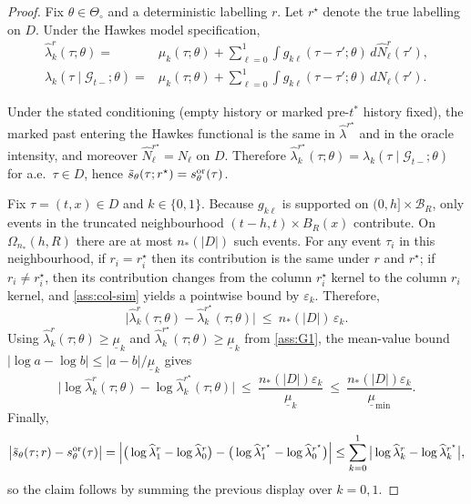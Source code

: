 \documentclass{statsoc}
\newcommand{\1}{\mathbbm{1}}
\begin{document}
\begin{proof}
Fix $\theta\in\Theta_\circ$ and a deterministic labelling $r$.
Let $r^\star$ denote the true labelling on $D$.
Under the Hawkes model specification,
\begin{align*}
\widehat\lambda_k^r(\tau;\theta)
=&
\mu_k(\tau;\theta)+\sum_{\ell=0}^1\int g_{k\ell}(\tau-\tau';\theta)\,d\widehat N_\ell^r(\tau'),\\
\lambda_k(\tau\mid\mathcal G_{t-};\theta)
=&
\mu_k(\tau;\theta)+\sum_{\ell=0}^1\int g_{k\ell}(\tau-\tau';\theta)\,d N_\ell(\tau').
\end{align*}

Under the stated conditioning (empty history or marked pre-$t^\ast$ history fixed),
the marked past entering the Hawkes functional is the same in $\widehat\lambda^{r^\star}$ and in the oracle intensity,
and moreover $\widehat N_\ell^{r^\star}=N_\ell$ on $D$.
Therefore $\widehat\lambda_k^{r^\star}(\tau;\theta)=\lambda_k(\tau\mid\mathcal G_{t-};\theta)$ for a.e.\ $\tau\in D$, hence
$\tilde s_\theta(\tau;r^\star)=s^{\rm or}_\theta(\tau)$.

Fix $\tau=(t,x)\in D$ and $k\in\{0,1\}$. Because $g_{k\ell}$ is supported on $(0,h]\times \mathcal B_R$,
only events in the truncated neighbourhood $(t-h,t)\times B_R(x)$ contribute. On $\Omega_{n_*}(h,R)$ there are at most
$n_*(|D|)$ such events.
For any event $\tau_i$ in this neighbourhood, if $r_i=r_i^\star$ then its contribution is the same under $r$ and $r^\star$;
if $r_i\neq r_i^\star$, then its contribution changes from the column $r_i^\star$ kernel to the column $r_i$ kernel, and
\cref{ass:col-sim} yields a pointwise bound by $\varepsilon_k$.
Therefore,
\[
\big|\widehat\lambda_k^r(\tau;\theta)-\widehat\lambda_k^{r^\star}(\tau;\theta)\big|
\ \le\ n_*(|D|)\,\varepsilon_k.
\]
Using $\widehat\lambda_k^r(\tau;\theta)\ge \underline\mu_k$ and $\widehat\lambda_k^{r^\star}(\tau;\theta)\ge \underline\mu_k$
from \cref{ass:G1}, the mean-value bound $|\log a-\log b|\le |a-b|/\underline\mu_k$ gives
\[
\big|\log\widehat\lambda_k^r(\tau;\theta)-\log\widehat\lambda_k^{r^\star}(\tau;\theta)\big|
\ \le\ \frac{n_*(|D|)\varepsilon_k}{\underline\mu_k}
\ \le\ \frac{n_*(|D|)\varepsilon_k}{\underline\mu_{\min}}.
\]
Finally,
\[
\big|\tilde s_\theta(\tau;r)-s^{\rm or}_\theta(\tau)\big|
=
\Big|\big(\log\widehat\lambda_1^r-\log\widehat\lambda_0^r\big)
-\big(\log\widehat\lambda_1^{r^\star}-\log\widehat\lambda_0^{r^\star}\big)\Big|
\le
\sum_{k=0}^1\big|\log\widehat\lambda_k^r-\log\widehat\lambda_k^{r^\star}\big|,
\]
so the claim follows by summing the previous display over $k=0,1$.
\end{proof}
\end{document}
